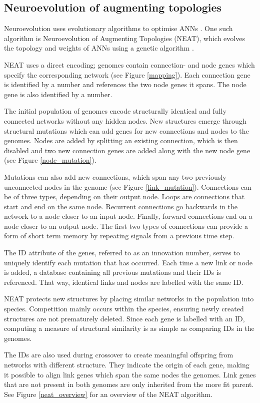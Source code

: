 \subsection{Neuroevolution of augmenting topologies}
Neuroevolution uses evolutionary algorithms to optimise ANNs \cite{neuroevolution_review}.
One such algorithm is Neuroevolution of Augmenting Topologies (NEAT), which evolves the topology and weights of ANNs
using a genetic algorithm \cite{neat_main, neat_short, neat_phd}.

NEAT uses a direct encoding; genomes contain connection- and node genes which specify the corresponding
network (see Figure \ref{mapping}). Each connection gene is identified by a number and
references the two node genes it spans. The node gene is also identified by a number.



The initial population of genomes encode structurally identical and fully connected networks without any hidden nodes.
New structures emerge through structural mutations which can add genes for new connections and nodes to the genomes.
Nodes are added by splitting an existing connection, which is then disabled and two new connection genes are added along
with the new node gene (see Figure \ref{node_mutation}).



Mutations can also add new connections, which span any two previously unconnected nodes in the genome (see Figure \ref{link_mutation}).
Connections can be of three types, depending on their output node. Loops are connections that start and end on the same node. Recurrent
connections go backwards in the network to a node closer to an input node. Finally, forward connections end on a node closer to an output
node. The first two types of connections can provide a form of short term memory by repeating signals from a previous time step.



The ID attribute of the genes, referred to as an innovation number, serves to uniquely identify each mutation that has occurred.
Each time a new link or node is added, a database containing all previous mutations and their IDs is referenced. That way,
identical links and nodes are labelled with the same ID.

NEAT protects new structures by placing similar networks in the population into species.
Competition mainly occurs within the species, ensuring newly created structures are not prematurely deleted.
Since each gene is labelled with an ID, computing a measure of structural similarity is as simple as
comparing IDs in the genomes.

The IDs are also used during crossover to create meaningful offspring from networks with different structure.
They indicate the origin of each gene, making it possible to align link genes which span the same nodes the genomes. Link genes
that are not present in both genomes are only inherited from the more fit parent. See Figure \ref{neat_overview} for an overview
of the NEAT algorithm.


